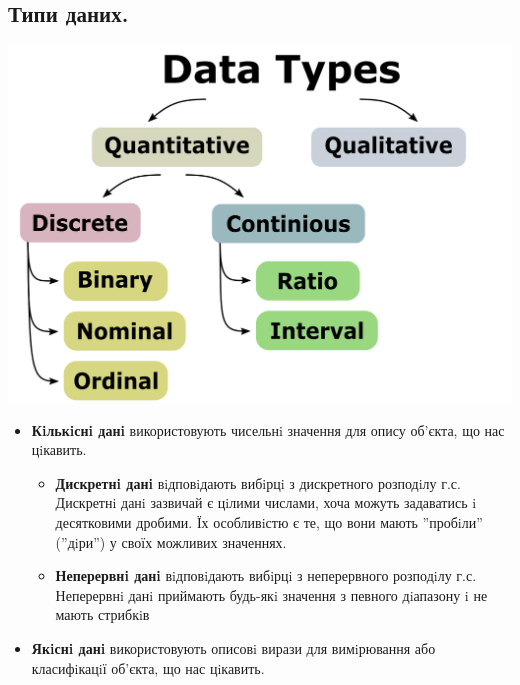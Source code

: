 \subsection{Типи даних.}
\begin{center}
 \includegraphics[scale=0.36]{assets/lectures_part_5-a3868f99.png}
\end{center}
\begin{itemize}
    \item \textbf{\color{javared} Кiлькiснi данi } використовують чисельнi значення для опису об’єкта, що нас цiкавить.
    \begin{itemize}
        \item \textbf{\color{javadocblue}Дискретнi данi} вiдповiдають вибiрцi з дискретного розподiлу г.с.
Дискретнi данi зазвичай є цiлими числами, хоча можуть задаватись i десятковими
дробими. Їх особливiстю є те, що вони мають ”пробiли” (”дiри”) у своїх можливих
значеннях.
\item
\textbf{\color{javadocblue}Неперервнi данi} вiдповiдають вибiрцi з неперервного розподiлу г.с.
Неперервнi данi приймають будь-якi значення з певного дiапазону i не мають
стрибкiв
    \end{itemize}
\item \textbf{\color{javared}Якiснi данi} використовують описовi вирази для вимiрювання або класифiкацiї об’єкта,
що нас цiкавить.
\end{itemize}
\newpage
